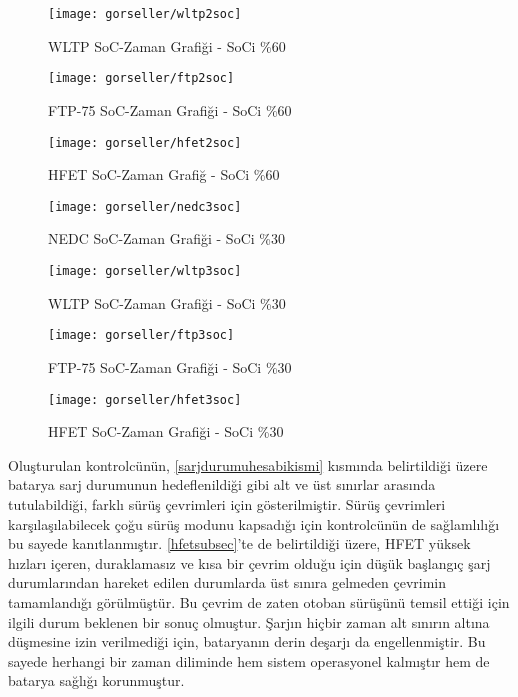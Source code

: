 \begin{figure}[h]
    \centering
    \texttt{[image: gorseller/wltp2soc]}
    \caption{WLTP SoC-Zaman Grafiği - SoCi \%60}\label{fig:wltp2soc}
\end{figure}

\begin{figure}[h]
    \centering
    \texttt{[image: gorseller/ftp2soc]}
    \caption{FTP-75 SoC-Zaman Grafiği - SoCi \%60}\label{fig:ftp2soc}
\end{figure}

\begin{figure}[h]
    \centering
    \texttt{[image: gorseller/hfet2soc]}
    \caption{HFET SoC-Zaman Grafiğ - SoCi \%60}\label{fig:hfet2soc}
\end{figure}
%
\begin{figure}[h]
    \centering
    \texttt{[image: gorseller/nedc3soc]}
    \caption{NEDC SoC-Zaman Grafiği - SoCi \%30}\label{fig:nedc3soc}
\end{figure}

\begin{figure}[h]
    \centering
    \texttt{[image: gorseller/wltp3soc]}
    \caption{WLTP SoC-Zaman Grafiği - SoCi \%30}\label{fig:wltp3soc}
\end{figure}

\begin{figure}[h]
    \centering
    \texttt{[image: gorseller/ftp3soc]}
    \caption{FTP-75 SoC-Zaman Grafiği - SoCi \%30}\label{fig:ftp3soc}
\end{figure}

\begin{figure}[h]
    \centering
    \texttt{[image: gorseller/hfet3soc]}
    \caption{HFET SoC-Zaman Grafiği - SoCi \%30}\label{fig:hfet3soc}
\end{figure}

Oluşturulan kontrolcünün, \ref{sarjdurumuhesabikismi} kısmında belirtildiği üzere batarya sarj durumunun hedeflenildiği gibi alt ve üst sınırlar arasında tutulabildiği, farklı sürüş çevrimleri için 
gösterilmiştir. Sürüş çevrimleri karşılaşılabilecek çoğu sürüş modunu kapsadığı için kontrolcünün de sağlamlılığı bu sayede kanıtlanmıştır. \ref{hfetsubsec}'te de belirtildiği üzere, HFET yüksek hızları içeren, duraklamasız ve kısa bir çevrim olduğu için düşük başlangıç şarj durumlarından hareket edilen 
durumlarda üst sınıra gelmeden çevrimin tamamlandığı görülmüştür. Bu çevrim de zaten otoban sürüşünü temsil ettiği için ilgili durum beklenen bir sonuç olmuştur. Şarjın hiçbir zaman alt sınırın altına düşmesine izin verilmediği için, bataryanın derin deşarjı da engellenmiştir. Bu sayede 
herhangi bir zaman diliminde hem sistem operasyonel kalmıştır hem de batarya sağlığı korunmuştur.

